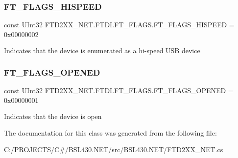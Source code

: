 \subsubsection{\texorpdfstring{FT\_FLAGS\_HISPEED}{FT\_FLAGS\_HISPEED}}
{\footnotesize\ttfamily const U\+Int32 F\+T\+D2\+X\+X\+\_\+\+N\+E\+T.\+F\+T\+D\+I.\+F\+T\+\_\+\+F\+L\+A\+G\+S.\+F\+T\+\_\+\+F\+L\+A\+G\+S\+\_\+\+H\+I\+S\+P\+E\+ED = 0x00000002}



Indicates that the device is enumerated as a hi-\/speed U\+SB device 

\mbox{\label{class_f_t_d2_x_x___n_e_t_1_1_f_t_d_i_1_1_f_t___f_l_a_g_s_ab0105ad1e89f0ed8e5551d0fd58e5e9c}} 
\subsubsection{\texorpdfstring{FT\_FLAGS\_OPENED}{FT\_FLAGS\_OPENED}}
{\footnotesize\ttfamily const U\+Int32 F\+T\+D2\+X\+X\+\_\+\+N\+E\+T.\+F\+T\+D\+I.\+F\+T\+\_\+\+F\+L\+A\+G\+S.\+F\+T\+\_\+\+F\+L\+A\+G\+S\+\_\+\+O\+P\+E\+N\+ED = 0x00000001}



Indicates that the device is open 



The documentation for this class was generated from the following file\+:\begin{DoxyCompactItemize}
\item 
C\+:/\+P\+R\+O\+J\+E\+C\+T\+S/\+C\#/\+B\+S\+L430.\+N\+E\+T/src/\+B\+S\+L430.\+N\+E\+T/F\+T\+D2\+X\+X\+\_\+\+N\+E\+T.\+cs\end{DoxyCompactItemize}
